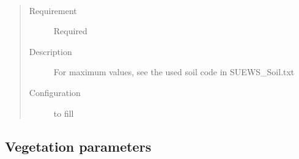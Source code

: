 \documentclass[letterpaper,10pt,english]{sphinxmanual}
\begin{document}
\begin{fulllineitems}
\label{\detokenize{input_files/Initial_Conditions/Soil_moisture_states:cmdoption-arg-soilstorebsoilstate}}~\begin{quote}\begin{description}
\item[{Requirement}] \leavevmode
Required

\item[{Description}] \leavevmode
For maximum values, see the used soil code in SUEWS\_Soil.txt

\item[{Configuration}] \leavevmode
to fill

\end{description}\end{quote}

\end{fulllineitems}



\subsection{Vegetation parameters}
\label{\detokenize{input_files/Initial_Conditions/Vegetation_parameters:vegetation-parameters}}\label{\detokenize{input_files/Initial_Conditions/Vegetation_parameters::doc}}\label{\detokenize{input_files/Initial_Conditions/Vegetation_parameters:id1}}
\end{document}
